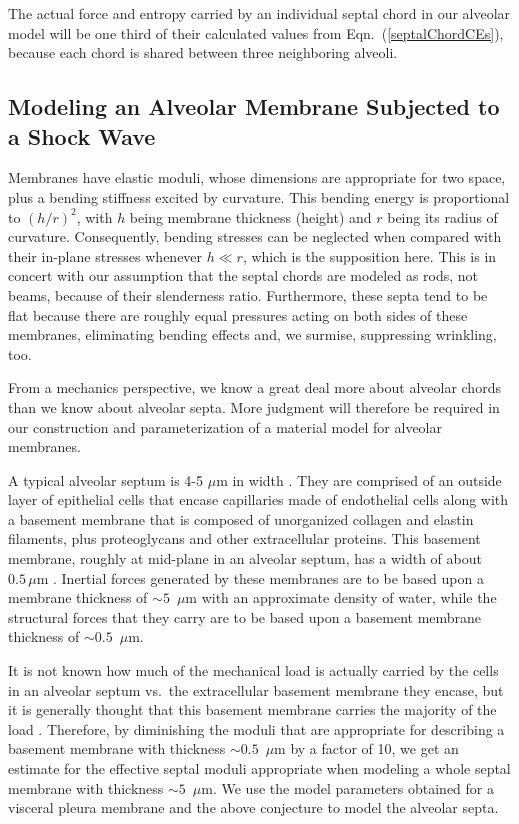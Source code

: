 The actual force and entropy carried by an individual septal chord in our alveolar model will be one third of their calculated values from Eqn.~(\ref{septalChordCEs}), because each chord is shared between three neighboring alveoli.


\subsection{Modeling an Alveolar Membrane Subjected to a Shock Wave}
  
Membranes have elastic moduli, whose dimensions are appropriate for two space, plus a bending stiffness excited by curvature.  This bending energy is proportional to $(h/r)^2$, with $h$ being membrane thickness (height) and $r$ being its radius of curvature.  Consequently, bending stresses can be neglected when compared with their in-plane stresses whenever $h \ll r$, which is the supposition here.  This is in concert with our assumption that the septal chords are modeled as rods, not beams, because of their slenderness ratio.  Furthermore, these septa tend to be flat because there are roughly equal pressures acting on both sides of these membranes, eliminating bending effects and, we surmise, suppressing wrinkling, too.

From a mechanics perspective, we know a great deal more about alveolar chords than we know about alveolar septa.  More judgment will therefore be required in our construction and parameterization of a material model for alveolar membranes.  

A typical alveolar septum is 4-5 $\mu$m in width \cite{Sukietal11}.  They are comprised of an outside layer of epithelial cells that encase capillaries made of endothelial cells along with a basement membrane that is composed of unorganized collagen and elastin filaments, plus proteoglycans and other extracellular proteins.  This basement membrane, roughly at mid-plane in an alveolar septum, has a width of about $0.5 \, \mu$m \cite{RoanWaters11}.  Inertial forces generated by these membranes are to be based upon a membrane thickness of $\sim\!\!5$~$\mu$m with an approximate density of water, while the structural forces that they carry are to be based upon a basement membrane thickness of $\sim\!\! 0.5$~$\mu$m.  

It is not known how much of the mechanical load is actually carried by the cells in an alveolar septum vs.\ the extracellular basement membrane they encase, but it is generally thought that this basement membrane carries the majority of the load \cite{Sukietal11}.  Therefore, by diminishing the moduli that are appropriate for describing a basement membrane with thickness $\sim\!\! 0.5$~$\mu$m by a factor of 10, we get an estimate for the effective septal moduli appropriate when modeling a whole septal membrane with thickness $\sim\!\! 5$~$\mu$m.  We use the model parameters obtained for a visceral pleura membrane \cite{Freedetal17} and the above conjecture to model the alveolar septa.

